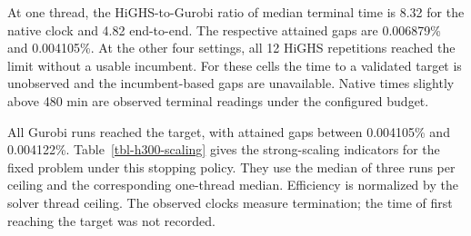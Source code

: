 \documentclass[
  english,
  11pt,
  a4paper,
  authoryear,
  preprint]{elsarticle}
\begin{document}
At one thread, the HiGHS-to-Gurobi ratio of median terminal time is 8.32
for the native clock and 4.82 end-to-end. The respective attained gaps
are 0.006879\% and 0.004105\%. At the other four settings, all 12 HiGHS
repetitions reached the limit without a usable incumbent. For these
cells the time to a validated target is unobserved and the
incumbent-based gaps are unavailable. Native times slightly above 480
min are observed terminal readings under the configured budget.

All Gurobi runs reached the target, with attained gaps between
0.004105\% and 0.004122\%. Table~\ref{tbl-h300-scaling} gives the
strong-scaling indicators for the fixed problem under this stopping
policy. They use the median of three runs per ceiling and the
corresponding one-thread median. Efficiency is normalized by the solver
thread ceiling. The observed clocks measure termination; the time of
first reaching the target was not recorded.
\end{document}
